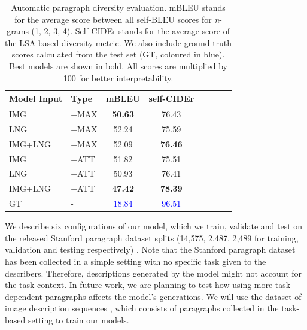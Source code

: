 \documentclass[11pt,a4paper]{article}
\begin{document}
\begin{table}[h]
  \footnotesize
 \centering
 \begin{tabular}{|l|l|c|c|c|c|c|c|}
 \hline
  \textbf{Model Input} & \textbf{Type} & \textbf{mBLEU} & \textbf{self-CIDEr} \\
 \hline
  IMG & +MAX & \cellcolor{red!30}\textbf{50.63} & \cellcolor{red!18}76.43 \\
 \hline
  LNG & +MAX & \cellcolor{red!10}52.24 & \cellcolor{red!10}75.59 \\
 \hline
  IMG+LNG & +MAX & \cellcolor{red!18}52.09 & \cellcolor{red!30}\textbf{76.46} \\
 \hline
 \hline
  IMG & +ATT & \cellcolor{red!10}51.82 & \cellcolor{red!10}75.51 \\
 \hline
  LNG & +ATT & \cellcolor{red!18}50.93 & \cellcolor{red!18}76.41 \\
 \hline
  IMG+LNG & +ATT & \cellcolor{red!30}\textbf{47.42} & \cellcolor{red!30}\textbf{78.39} \\
 \hline
 \hline
  GT & - & \textcolor{blue}{18.84} & \textcolor{blue}{96.51} \\
 \hline
 \end{tabular}
 \caption{Automatic paragraph diversity evaluation. mBLEU stands for the average score between all self-BLEU scores for \textit{n}-grams (1, 2, 3, 4). Self-CIDEr stands for the average score of the LSA-based diversity metric. We also include ground-truth scores calculated from the test set (GT, coloured in blue). Best models are shown in bold. All scores are multiplied by 100 for better interpretability.}
 \label{tab:divstats}
\end{table}

We describe six configurations of our model, which we train, validate and test on the released Stanford paragraph dataset splits (14,575, 2,487, 2,489 for training, validation and testing respectively) \cite{krause2016hierarchical}. %
Note that the Stanford paragraph dataset has been collected in a simple setting with no specific task given to the describers. Therefore, descriptions generated by the model might not account for the task context. In future work, we are planning to test how using more task-dependent paragraphs affects the model's generations. We will use the dataset of image description sequences \cite{ilinykh19}, which consists of paragraphs collected in the task-based setting to train our models.
\end{document}

